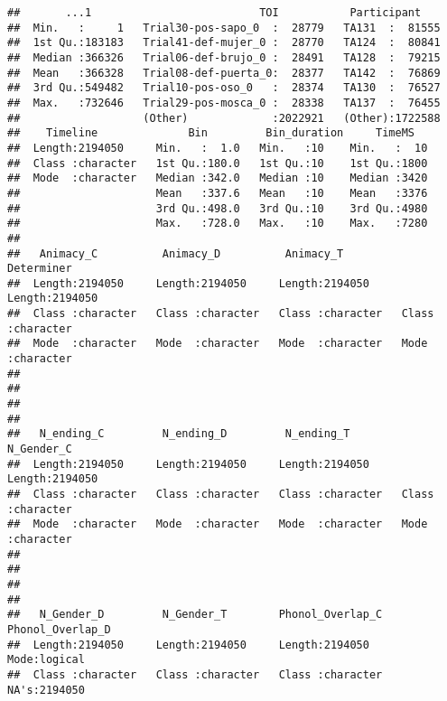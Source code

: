 \documentclass[
]{article}
\begin{document}
\begin{verbatim}
##       ...1                          TOI           Participant     
##  Min.   :     1   Trial30-pos-sapo_0  :  28779   TA131  :  81555  
##  1st Qu.:183183   Trial41-def-mujer_0 :  28770   TA124  :  80841  
##  Median :366326   Trial06-def-brujo_0 :  28491   TA128  :  79215  
##  Mean   :366328   Trial08-def-puerta_0:  28377   TA142  :  76869  
##  3rd Qu.:549482   Trial10-pos-oso_0   :  28374   TA130  :  76527  
##  Max.   :732646   Trial29-pos-mosca_0 :  28338   TA137  :  76455  
##                   (Other)             :2022921   (Other):1722588  
##    Timeline              Bin         Bin_duration     TimeMS    
##  Length:2194050     Min.   :  1.0   Min.   :10    Min.   :  10  
##  Class :character   1st Qu.:180.0   1st Qu.:10    1st Qu.:1800  
##  Mode  :character   Median :342.0   Median :10    Median :3420  
##                     Mean   :337.6   Mean   :10    Mean   :3376  
##                     3rd Qu.:498.0   3rd Qu.:10    3rd Qu.:4980  
##                     Max.   :728.0   Max.   :10    Max.   :7280  
##                                                                 
##   Animacy_C          Animacy_D          Animacy_T          Determiner       
##  Length:2194050     Length:2194050     Length:2194050     Length:2194050    
##  Class :character   Class :character   Class :character   Class :character  
##  Mode  :character   Mode  :character   Mode  :character   Mode  :character  
##                                                                             
##                                                                             
##                                                                             
##                                                                             
##   N_ending_C         N_ending_D         N_ending_T         N_Gender_C       
##  Length:2194050     Length:2194050     Length:2194050     Length:2194050    
##  Class :character   Class :character   Class :character   Class :character  
##  Mode  :character   Mode  :character   Mode  :character   Mode  :character  
##                                                                             
##                                                                             
##                                                                             
##                                                                             
##   N_Gender_D         N_Gender_T        Phonol_Overlap_C   Phonol_Overlap_D
##  Length:2194050     Length:2194050     Length:2194050     Mode:logical    
##  Class :character   Class :character   Class :character   NA's:2194050    

\end{verbatim}
\end{document}
